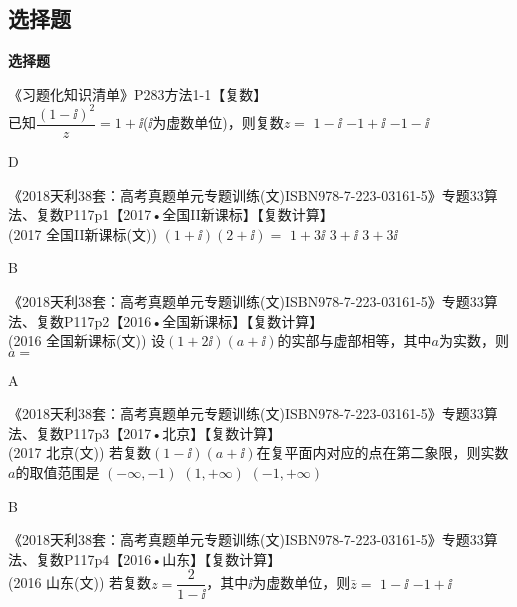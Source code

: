   \subsection{选择题}\begin{exercise}{\bf 选择题}
    \item 《习题化知识清单》P283方法1-1【复数】\\
      已知$\dfrac{(1-\ii)^2}z=1+\ii$($\ii$为虚数单位)，则复数$z=$\xz
       {$1-\ii$}
       {$-1+\ii$}
       {$-1-\ii$}
      \begin{answer}
        D
      \end{answer}
    \item 《2018天利38套：高考真题单元专题训练(文)ISBN978-7-223-03161-5》专题33算法、复数P117p1【2017•全国II新课标】【复数计算】\\
        {\kaishu (2017 \textbullet 全国II新课标(文))}
        $(1+\ii)(2+\ii)=$\xz
         {$1+3\ii$}
         {$3+\ii$}
         {$3+3\ii$}
        \begin{answer}
          B
        \end{answer}
    \item 《2018天利38套：高考真题单元专题训练(文)ISBN978-7-223-03161-5》专题33算法、复数P117p2【2016•全国新课标】【复数计算】\\
        {\kaishu (2016 \textbullet 全国新课标(文))}
        设$(1+2\ii)(a+\ii)$的实部与虚部相等，其中$a$为实数，则$a=$\xz
        \begin{answer}
          A
        \end{answer}
    \item 《2018天利38套：高考真题单元专题训练(文)ISBN978-7-223-03161-5》专题33算法、复数P117p3【2017•北京】【复数计算】\\
        {\kaishu (2017 \textbullet 北京(文))}
        若复数$(1-\ii)(a+\ii)$在复平面内对应的点在第二象限，则实数$a$的取值范围是\xz
         {$(-\infty,-1)$}
         {$(1,+\infty)$}
         {$(-1,+\infty)$}
        \begin{answer}
          B
        \end{answer}
    \item 《2018天利38套：高考真题单元专题训练(文)ISBN978-7-223-03161-5》专题33算法、复数P117p4【2016•山东】【复数计算】\\
        {\kaishu (2016 \textbullet 山东(文))}
        若复数$z=\dfrac2{1-\ii}$，其中$\ii$为虚数单位，则$\bar z=$\xz
         {$1-\ii$}
         {$-1+\ii$}

\end{exercise}
